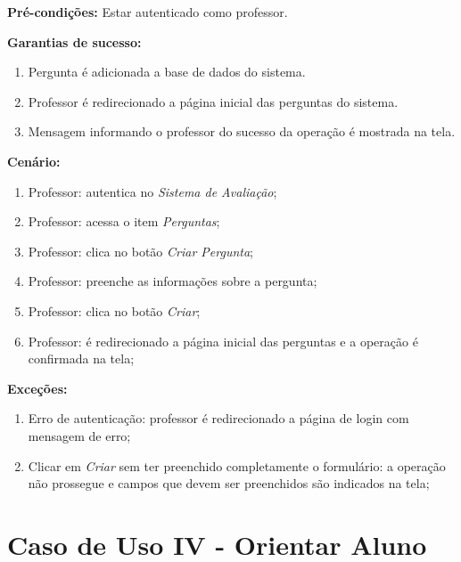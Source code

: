 \documentclass[
  12pt,       %
  openright,      %
  oneside,      %
  a4paper,      %
  english,      %
  french,        %
  spanish,     %
  brazil        %
  ]{abntex2-decsi}
\begin{document}
\begin{apendicesenv}
	\textbf{Pré-condições:} Estar autenticado como professor.
		
	\textbf{Garantias de sucesso:} 
        
            \begin{enumerate}
            
            \item Pergunta é adicionada a base de dados do sistema.  
            \item Professor é redirecionado a página inicial das perguntas do sistema.
            \item Mensagem informando o professor do sucesso da operação é mostrada na tela.
            
            \end{enumerate}
        
		\textbf{Cenário:}
		
		\begin{enumerate}
			\item Professor: autentica no \textit{Sistema de Avaliação};           
			\item Professor: acessa o item \textit{Perguntas};
            \item Professor: clica no botão \textit{Criar Pergunta};
			\item Professor: preenche as informações sobre a pergunta;
			\item Professor: clica no botão \textit{Criar};
            \item Professor: é redirecionado a página inicial das perguntas e a operação é confirmada na tela;
		\end{enumerate}
		
		\textbf{Exceções:}
		
			\begin{enumerate}	
				\item Erro de autenticação: professor é redirecionado a página de login com mensagem de erro;
				\item Clicar em \textit{Criar} sem ter preenchido completamente o formulário: a operação não prossegue e campos que devem ser preenchidos são indicados na tela;
			\end{enumerate}
    
    \newpage
    
    \section{Caso de Uso IV - Orientar Aluno}
    

\end{apendicesenv}
\end{document}
